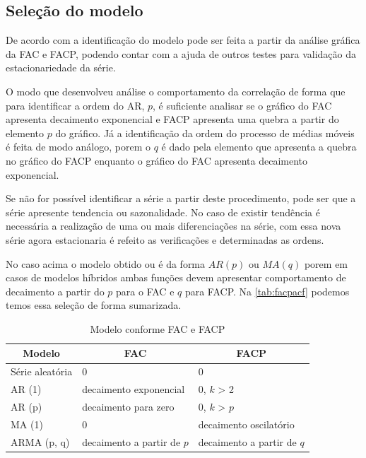 \documentclass[
    12pt,
    oneside,
    a4paper,
    english,
    brazil
]{abntex2}
\begin{document}
\subsection{Seleção do modelo}

De  acordo com   a  identificação do  modelo pode  ser feita  a
partir da análise gráfica  da FAC e FACP, podendo contar com  a ajuda de outros
testes para validação da estacionariedade da série.

O modo que   desenvolveu análise o  comportamento da correlação
de forma que  para identificar a ordem  do AR, $p$, é suficiente  analisar se o
gráfico do FAC  apresenta decaimento exponencial e FACP apresenta  uma quebra a
partir do elemento $p$  do gráfico. Já a identificação da  ordem do processo de
médias móveis  é feita de modo  análogo, porem o  $q$ é dado pela  elemento que
apresenta  a quebra  no gráfico  do FACP  enquanto o  gráfico do  FAC apresenta
decaimento exponencial.

Se não for  possível identificar a série a partir  deste procedimento, pode ser
que a série apresente tendencia ou sazonalidade. No caso de existir tendência é
necessária a realização  de uma ou mais diferenciações na  série, com essa nova
série agora estacionaria é refeito as verificações e determinadas as ordens.

No caso acima o  modelo obtido ou é da forma $AR(p)$ ou  $MA(q)$ porem em casos
de modelos híbridos ambas funções  devem apresentar comportamento de decaimento
a partir do $p$ para o FAC e $q$ para FACP\@. Na \autoref{tab:facpacf} podemos
temos essa seleção de forma sumarizada.


\begin{table}[ht]
    \centering
    \caption{Modelo conforme FAC e FACP}\label{tab:facpacf}
    \begin{tabular}{l l l}
        \multicolumn{1}{c}{Modelo} & \multicolumn{1}{c}{FAC} & \multicolumn{1}{c}{FACP} \\
        \toprule
        Série aleatória  & 0                          & 0                      \\
        AR (1)           & decaimento exponencial     & 0, $k$ > 2             \\
        AR (p)           & decaimento para zero       & 0, $k$ > $p$           \\
        MA (1)           & 0                          & decaimento oscilatório \\
        ARMA (p, q)      & decaimento a partir de $p$ & decaimento a partir de $q$
    \end{tabular}
\end{table}
\end{document}
